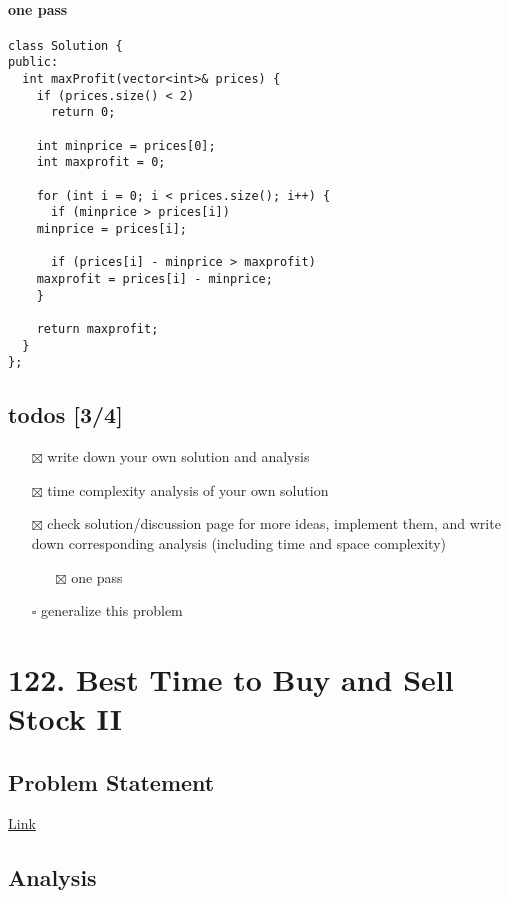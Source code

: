 \documentclass[12pt]{article}
\begin{document}
\paragraph{one pass}
\label{sec:org631a1a6}
\begin{verbatim}
class Solution {
public:
  int maxProfit(vector<int>& prices) {
    if (prices.size() < 2)
      return 0;

    int minprice = prices[0];
    int maxprofit = 0;

    for (int i = 0; i < prices.size(); i++) {
      if (minprice > prices[i])
	minprice = prices[i];

      if (prices[i] - minprice > maxprofit)
	maxprofit = prices[i] - minprice;
    }

    return maxprofit;
  }
};
\end{verbatim}
\subsection{todos [3/4]}
\label{sec:org847e10e}
\begin{itemize}
\item[{$\boxtimes$}] write down your own solution and analysis
\item[{$\boxtimes$}] time complexity analysis of your own solution
\item[{$\boxtimes$}] check solution/discussion page for more ideas, implement them, and write down corresponding analysis (including time and space complexity)
\begin{itemize}
\item[{$\boxtimes$}] one pass
\end{itemize}
\item[{$\square$}] generalize this problem
\end{itemize}
\section{122. Best Time to Buy and Sell Stock II \label{orgc60b77e}}
\label{sec:org9a30a03}
\subsection{Problem Statement}
\label{sec:org8009afc}
\href{https://leetcode.com/problems/best-time-to-buy-and-sell-stock-ii/}{Link}
\subsection{Analysis}
\label{sec:orgebc786d}
\end{document}
